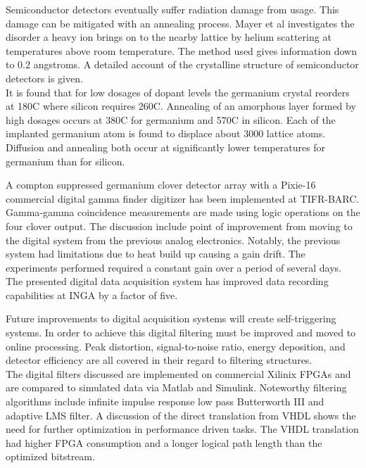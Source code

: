 \documentclass[12pt]{article}
\begin{document}
\begin{doublespacing}
\citep{Mayer}
Semiconductor detectors eventually suffer radiation damage from usage.
This damage can be mitigated with an annealing process.
Mayer et al investigates the disorder a heavy ion brings on to the nearby lattice by helium scattering at temperatures above room temperature.
The method used gives information down to 0.2 angstroms.
A detailed account of the crystalline structure of semiconductor detectors is given.
\\

It is found that for low dosages of dopant levels the germanium crystal reorders at 180C where silicon requires 260C.
Annealing of an amorphous layer formed by high dosages occurs at 380C for germanium and 570C in silicon.
Each of the implanted germanium atom is found to displace about 3000 lattice atoms.
Diffusion and annealing both occur at significantly lower temperatures for germanium than for silicon.

\citep{Palit201290}
A compton suppressed germanium clover detector array with a Pixie-16 commercial digital gamma finder digitizer has been implemented at TIFR-BARC.
Gamma-gamma coincidence measurements are made using logic operations on the four clover output.
The discussion include point of improvement from moving to the digital system from the previous analog electronics.
Notably, the previous system had limitations due to heat build up causing a gain drift.
The experiments performed required a constant gain over a period of several days.
The presented digital data acquisition system has improved data recording capabilities at INGA by a factor of five.

\citep{Alberto200999}
Future improvements to digital acquisition systems will create self-triggering systems.
In order to achieve this digital filtering must be improved and moved to online processing.
Peak distortion, signal-to-noise ratio, energy deposition, and detector efficiency are all covered in their regard to filtering structures.
\\

The digital filters discussed are implemented on commercial Xilinix FPGAs and are compared to simulated data via Matlab and Simulink.
Noteworthy filtering algorithms include infinite impulse response low pass Butterworth III and adaptive LMS filter.
A discussion of the direct translation from VHDL shows the need for further optimization in performance driven tasks.
The VHDL translation had higher FPGA consumption and a longer logical path length than the optimized bitstream.



\pagebreak
\end{doublespacing}


\end{document}
